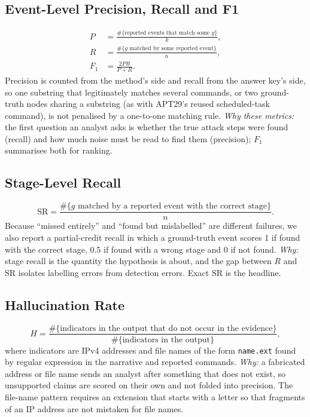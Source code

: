 \subsection{Event-Level Precision, Recall and F1}
\begin{align}
P&=\frac{\#\{\text{reported events that match some } g\}}{k},\\
R&=\frac{\#\{g\text{ matched by some reported event}\}}{n},\\
F_1&=\frac{2PR}{P+R}.
\end{align}
Precision is counted from the method's side and recall from the answer key's side, so one substring that legitimately matches several commands, or two ground-truth nodes sharing a substring (as with APT29's reused scheduled-task command), is not penalised by a one-to-one matching rule. \emph{Why these metrics:} the first question an analyst asks is whether the true attack steps were found (recall) and how much noise must be read to find them (precision); $F_1$ summarises both for ranking.

\subsection{Stage-Level Recall}
\begin{equation}
\mathrm{SR}=\frac{\#\{g\text{ matched by a reported event with the correct stage}\}}{n}.
\end{equation}
Because ``missed entirely'' and ``found but mislabelled'' are different failures, we also report a partial-credit recall in which a ground-truth event scores 1 if found with the correct stage, 0.5 if found with a wrong stage and 0 if not found. \emph{Why:} stage recall is the quantity the hypothesis is about, and the gap between $R$ and $\mathrm{SR}$ isolates labelling errors from detection errors. Exact $\mathrm{SR}$ is the headline.

\subsection{Hallucination Rate}
\begin{equation}
H=\frac{\#\{\text{indicators in the output that do not occur in the evidence}\}}{\#\{\text{indicators in the output}\}},
\end{equation}
where indicators are IPv4 addresses and file names of the form \texttt{name.ext} found by regular expression in the narrative and reported commands. \emph{Why:} a fabricated address or file name sends an analyst after something that does not exist, so unsupported claims are scored on their own and not folded into precision. The file-name pattern requires an extension that starts with a letter so that fragments of an IP address are not mistaken for file names.

